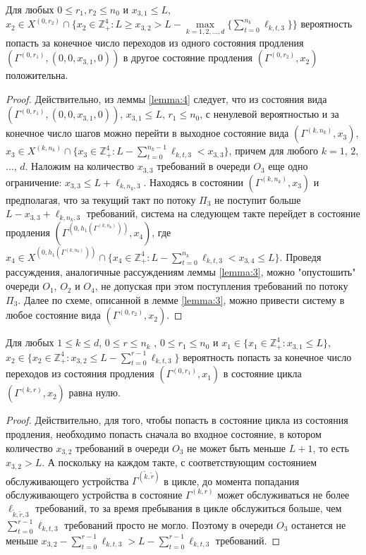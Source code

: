 \documentclass[a4paper,12pt,russian]{extarticle}
\begin{document}
\begin{lemma}
Для любых $0 \leqslant r_1, r_2 \leqslant n_0$ и $x_{3,1}\leqslant L$, $x_2 \in X^{(0,r_2)}\cap \{x_2 \in \mathbb{Z}_+^4 \colon L \geqslant x_{3,2} > L - \max\limits_{k=1, 2, \ldots, d}\{\sum_{t=0}^{n_k} \ell_{k,t,3}\}\}$ вероятность попасть за конечное число переходов из одного состояния продления $(\Gamma^{(0,r_1)},(0,0,x_{3,1},0))$ в другое состояние продления $(\Gamma^{(0,r_2)},x_2)$ положительна.
\label{lemma:6}
\end{lemma}
\begin{proof}
Действительно, из леммы \eqref{lemma:4} следует, что из состояния вида $(\Gamma^{(0,r_1)},(0,0,x_{3,1},0))$, $x_{3,1}\leqslant L$, $r_1 \leqslant n_0$, с ненулевой вероятностью и за конечное число шагов можно перейти в выходное состояние вида $(\Gamma^{(k,n_k)},x_3)$, $x_3 \in X^{(k,n_k)}\cap \{x_3 \in \mathbb{Z}_+^4 \colon   L - \sum_{t=0}^{n_k-1} \ell_{k,t,3} < x_{3,3}\}$, причем для любого $k=1$, $2$, $\ldots$, $d$. Наложим на количество $x_{3,3}$ требований в очереди $O_3$ еще одно ограничение: $x_{3,3} \leqslant L + \ell_{k,n_k,3}$. Находясь в состоянии $(\Gamma^{(k,n_k)},x_3)$ и предполагая, что за текущий такт по потоку $\Pi_3$ не поступит больше $L - x_{3,3} + \ell_{k,n_k,3}$ требований, система на следующем такте перейдет в состояние продления $(\Gamma^{(0,h_1(\Gamma^{(k,n_k)}))}, x_4)$, где $x_4 \in X^{(0,h_1(\Gamma^{(k,n_k)}))}\cap \{x_4 \in \mathbb{Z}_+^4 \colon  L - \sum_{t=0}^{n_k} \ell_{k,t,3} < x_{3,4} \leqslant L\}$. Проведя рассуждения, аналогичные рассуждениям леммы \ref{lemma:3}, можно "опустошить" очереди $O_1$, $O_2$ и $O_4$, не допуская при этом поступления требований по потоку $\Pi_3$. Далее по схеме, описанной в лемме \ref{lemma:3}, можно привести систему в любое состояние вида $(\Gamma^{(0,r_2)}, x_2)$.
\end{proof}


\begin{lemma}
Для любых $1 \leqslant k \leqslant d$, $0 \leqslant r \leqslant n_k$ , $0 \leqslant r_1 \leqslant n_0$ и $x_1 \in \{x_1 \in \mathbb{Z}_+^4 \colon x_{3,1}\leqslant L\}$, $x_2 \in \{x_2 \in \mathbb{Z}_+^4 \colon x_{3,2} \leqslant L -\sum_{t=0}^{r-1} \ell_{k,t,3}\}$ вероятность попасть за конечное число переходов из состояния продления $(\Gamma^{(0,r_1)},x_1)$ в состояние цикла $(\Gamma^{(k,r)},x_2)$ равна нулю.
\label{lemma:7}
\end{lemma}
\begin{proof}
Действительно, для того, чтобы попасть в состояние цикла из состояния продления, необходимо попасть сначала во входное состояние, в котором количество $x_{3,2}$ требований в очереди $O_3$ не может быть меньше $L+1$, то есть $x_{3,2} > L$. А поскольку на каждом такте, с соответствующим состоянием обслуживающего устройства $\Gamma^{(\tilde{k},\tilde{r})}$ в цикле, до момента попадания обслуживающего устройства в состояние $\Gamma^{(k,r)}$ может обслуживаться не более $\ell_{\tilde{k},\tilde{r}, 3}$ требований, то за время пребывания в цикле обслужиться больше, чем $\sum_{t=0}^{r-1} \ell_{k,t,3}$ требований просто не могло. Поэтому в очереди $O_3$ останется не меньше $x_{3,2} -\sum_{t=0}^{r-1} \ell_{k,t,3}> L - \sum_{t=0}^{r-1} \ell_{k,t,3}$ требований.
\end{proof}
\end{document}
